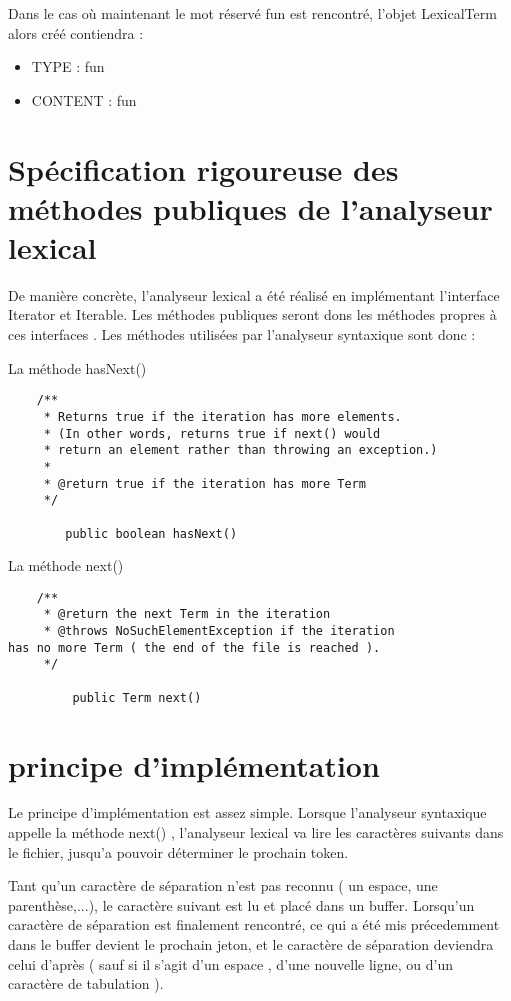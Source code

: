 Dans le cas où maintenant le mot réservé fun est rencontré, l'objet LexicalTerm alors créé contiendra : 
\begin{itemize}
\item TYPE : fun
\item CONTENT : fun
\end{itemize}

\section{Spécification rigoureuse des méthodes publiques de l'analyseur lexical}

De manière concrète, l'analyseur lexical a été réalisé en implémentant l'interface Iterator et Iterable. Les méthodes publiques seront dons les méthodes propres à ces interfaces . Les méthodes utilisées par l'analyseur syntaxique sont donc :

La méthode hasNext()
\begin{verbatim}
    /**
     * Returns true if the iteration has more elements.
     * (In other words, returns true if next() would
     * return an element rather than throwing an exception.)
     *
     * @return true if the iteration has more Term
     */
		
		public boolean hasNext()
\end{verbatim}


La méthode next()
\begin{verbatim}
    /**
     * @return the next Term in the iteration
     * @throws NoSuchElementException if the iteration 
has no more Term ( the end of the file is reached ).
     */

		 public Term next()
\end{verbatim}


\section{principe d'implémentation}

Le principe d'implémentation est assez simple. Lorsque l'analyseur syntaxique appelle la méthode next() , l'analyseur lexical va lire les caractères suivants dans le fichier, jusqu'a pouvoir déterminer le prochain token.

Tant qu'un caractère de séparation n'est pas reconnu ( un espace, une parenthèse,...), le caractère suivant est lu et placé dans un buffer. Lorsqu'un caractère de séparation est finalement rencontré, ce qui a été mis précedemment dans le buffer devient le prochain jeton, et le caractère de séparation deviendra celui d'après ( sauf si il s'agit d'un espace , d'une nouvelle ligne, ou d'un caractère de tabulation ).


